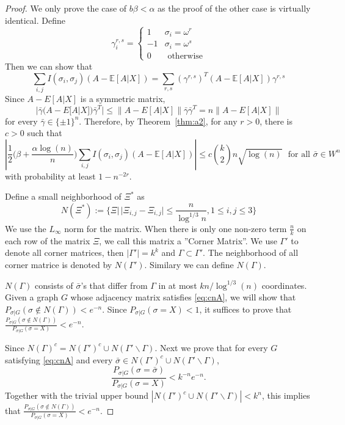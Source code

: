 \documentclass{article}
\begin{document}
\begin{proof}
We only prove the case of $b\beta <\alpha$ as the proof of the other case is virtually identical.
Define
$$
\gamma^{r,s}_i = \begin{cases}
1 & \sigma_i = \omega^r \\
-1 & \sigma_i = \omega^s \\
0 & \textrm{ otherwise}
\end{cases}
$$
Then we can show that
$$
\sum_{i,j} I(\sigma_i, \sigma_j) (A-\mathbb{E}[A|X]) = \sum_{r,s} (\gamma^{r,s})^T (A-\mathbb{E}[A|X])\gamma^{r,s}
$$
Since $A-E[A|X]$ is a symmetric matrix,
$$
|\bar{\gamma}  (A-E[A|X]) \bar{\gamma}^T|\le
\|A-E[A|X]\| \bar{\gamma} \bar{\gamma}^T=n \|A-E[A|X]\|
$$
for every $\bar{\gamma}\in\{\pm 1\}^n$.
Therefore, by Theorem~\ref{thm:a2}, for any $r>0$, there is $c>0$ such that
\begin{equation} \label{eq:cnA}
\left|\frac{1}{2} \big(\beta+\frac{\alpha\log(n)}{n} \big)\sum_{i,j} I(\sigma_i, \sigma_j) (A-\mathbb{E}[A|X]) 
\right| \le c\binom{k}{2} n \sqrt{\log(n)}
  \text{~~for all~} \bar{\sigma}\in W^n
\end{equation}
with probability at least $1-n^{-2r}$.

Define a small neighborhood of $\Xi^*$ as
$$
N(\Xi^*) := \{\Xi |\, |\Xi_{i,j} - \Xi_{i,j}| \leq \frac{n}{\log^{1/3} n}, 1\leq i,j\leq 3\}
$$
We use the $L_{\infty}$ norm for the matrix.
 When there is only one non-zero term $\frac{n}{k}$ on each row of the matrix $\Xi$, we call this matrix a ''Corner Matrix''.
 We use $\Gamma'$ to denote all corner matrices, then $|\Gamma'|=k^k$ and $\Gamma \subset \Gamma'$. The neighborhood of all corner matrice is denoted by $N(\Gamma')$. Similary we can define $N(\Gamma)$. 

$N(\Gamma)$ consists of $\bar{\sigma}$'s that differ from $\Gamma$ in at most $kn/\log^{1/3}(n)$ coordinates.
Given a graph $G$ whose adjacency matrix satisfies \eqref{eq:cnA}, we will show that $P_{\sigma|G}(\sigma\notin N(\Gamma))< e^{-n}$. Since $P_{\sigma|G}(\sigma=X)<1$, it suffices to prove that
$\frac{P_{\sigma|G}(\sigma\notin N(\Gamma))}{P_{\sigma|G}(\sigma=X)}<e^{-n}$. 

Since  $N(\Gamma)^c=N(\Gamma')^c\cup N(\Gamma' \backslash \Gamma)$.
Next we prove that for every $G$ satisfying \eqref{eq:cnA} and every
$\bar{\sigma}\in N(\Gamma')^c\cup N(\Gamma' \backslash \Gamma)$, 
\begin{equation} \label{eq:xmb}
\frac{P_{\sigma|G}(\sigma=\bar{\sigma})}{P_{\sigma|G}(\sigma=X)}<k^{-n}e^{-n} .
\end{equation}
Together with the trivial upper bound $|N(\Gamma')^c\cup N(\Gamma' \backslash \Gamma)|<k^n$, this implies that $\frac{P_{\sigma|G}(\sigma\notin N(\Gamma))}{P_{\sigma|G}(\sigma=X)}<e^{-n}$.


\end{proof}
\end{document}
